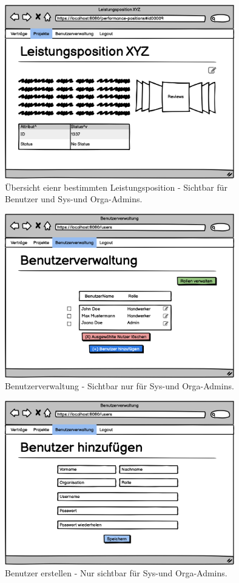 \begin{figure}[h]
\centering
\includegraphics[width=10cm]{img/mockup_web/admin-und-benutzer-leistungsposition-exmpl.png}
\caption{Übersicht eienr bestimmten Leistungsposition - Sichtbar für Benutzer und Sys-und Orga-Admins.}
\end{figure}

\begin{figure}[h]
\centering
\includegraphics[width=10cm]{img/mockup_web/admin-und-benutzer-benutzerverwaltung.png}
\caption{Benutzerverwaltung - Sichtbar nur für Sys-und Orga-Admins.}
\end{figure}

\begin{figure}[h]
\centering
\includegraphics[width=10cm]{img/mockup_web/admin-und-benutzer-erstellen.png}
\caption{Benutzer erstellen - Nur sichtbar für Sys-und Orga-Admins.}
\end{figure}

